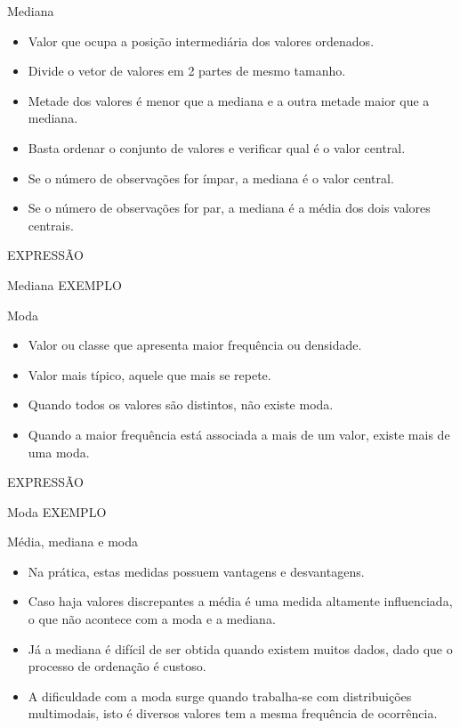 \documentclass[
  ignorenonframetext,
  serif,
  professionalfont,
  usenames,
  dvipsnames,
  aspectratio = 169]{beamer}
\providecommand{\tightlist}{%
  \setlength{\itemsep}{0pt}\setlength{\parskip}{0pt}}
\renewcommand{\tightlist}{%
  \setlength{\itemsep}{0\baselineskip}
  \setlength{\parskip}{0.25\baselineskip}
}
\begin{document}
\begin{frame}{Mediana}
\protect\hypertarget{mediana}{}
\begin{itemize}
\tightlist
\item
  Valor que ocupa a posição intermediária dos valores ordenados.
\item
  Divide o vetor de valores em 2 partes de mesmo tamanho.
\item
  Metade dos valores é menor que a mediana e a outra metade maior que a
  mediana.
\item
  Basta ordenar o conjunto de valores e verificar qual é o valor
  central.
\item
  Se o número de observações for ímpar, a mediana é o valor central.
\item
  Se o número de observações for par, a mediana é a média dos dois
  valores centrais.
\end{itemize}

EXPRESSÃO
\end{frame}

\begin{frame}{Mediana}
\protect\hypertarget{mediana-1}{}
EXEMPLO
\end{frame}

\begin{frame}{Moda}
\protect\hypertarget{moda}{}
\begin{itemize}
\tightlist
\item
  Valor ou classe que apresenta maior frequência ou densidade.
\item
  Valor mais típico, aquele que mais se repete.
\item
  Quando todos os valores são distintos, não existe moda.
\item
  Quando a maior frequência está associada a mais de um valor, existe
  mais de uma moda.
\end{itemize}

EXPRESSÃO
\end{frame}

\begin{frame}{Moda}
\protect\hypertarget{moda-1}{}
EXEMPLO
\end{frame}

\begin{frame}{Média, mediana e moda}
\protect\hypertarget{muxe9dia-mediana-e-moda}{}
\begin{itemize}
\item
  Na prática, estas medidas possuem vantagens e desvantagens.
\item
  Caso haja valores discrepantes a média é uma medida altamente
  influenciada, o que não acontece com a moda e a mediana.
\item
  Já a mediana é difícil de ser obtida quando existem muitos dados, dado
  que o processo de ordenação é custoso.
\item
  A dificuldade com a moda surge quando trabalha-se com distribuições
  multimodais, isto é diversos valores tem a mesma frequência de
  ocorrência.
\end{itemize}
\end{frame}
\end{document}
